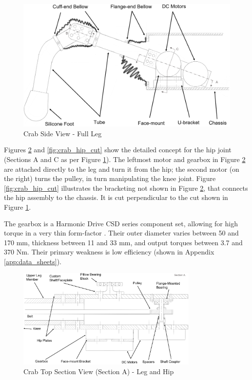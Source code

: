 \begin{figure}[H]
    \centering
    \includegraphics[width=\textwidth]{3_DesignConcepts/img/Crab/crab_leg.png}
    \caption{Crab Side View - Full Leg}
    \label{fig:crab_leg}
\end{figure}

Figures \ref{fig:crab_hip} and \ref{fig:crab_hip_cut} show the detailed concept for the hip joint (Sections A and C as per Figure \ref{fig:crab_leg}).
The leftmost motor and gearbox in Figure \ref{fig:crab_hip} are attached directly to the leg and turn it from the hip; the second motor (on the right) turns the pulley, in turn manipulating the knee joint.
Figure \ref{fig:crab_hip_cut} illustrates the bracketing not shown in Figure \ref{fig:crab_hip}, that connects the hip assembly to the chassis.
It is cut perpendicular to the cut shown in Figure \ref{fig:crab_leg}.

The gearbox is a Harmonic Drive CSD series component set, allowing for high torque in a very thin form-factor \cite{harmonic_drive_csd-2a_nodate}. Their outer diameter varies between 50 and 170 mm, thickness between 11 and 33 mm, and output torques between 3.7 and 370 Nm.
Their primary weakness is low efficiency (shown in Appendix \ref{app:data_sheets}).

\begin{figure}[H]
    \centering
    \includegraphics[width=0.8\textwidth]{3_DesignConcepts/img/Crab/crab_hip.png}
    \caption{Crab Top Section View (Section A) - Leg and Hip}
    \label{fig:crab_hip}
\end{figure}

